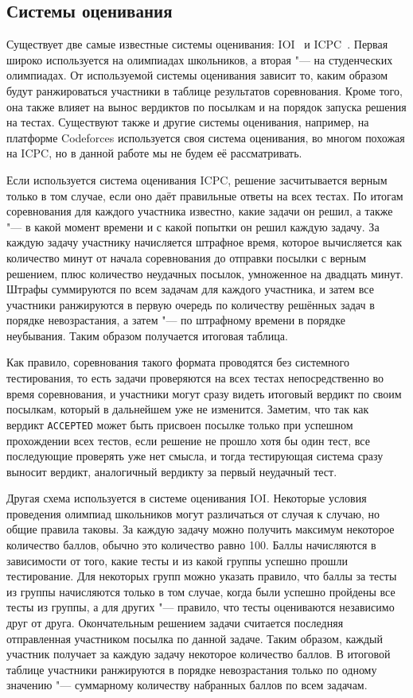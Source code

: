 \subsection{Системы оценивания}

Существует две самые известные системы оценивания: IOI~\cite{ioi} и ICPC~\cite{icpc}. Первая широко используется на олимпиадах школьников, а вторая "--- на студенческих олимпиадах. От используемой системы оценивания зависит то, каким образом будут ранжироваться участники в таблице результатов соревнования. Кроме того, она также влияет на вынос вердиктов по посылкам и на порядок запуска решения на тестах. Существуют также и другие системы оценивания, например, на платформе Codeforces \cite{codeforces} используется своя система оценивания, во многом похожая на ICPC, но в данной работе мы не будем её рассматривать.

Если используется система оценивания ICPC, решение засчитывается верным только в том случае, если оно даёт правильные ответы на всех тестах. По итогам соревнования для каждого участника известно, какие задачи он решил, а также "--- в какой момент времени и с какой попытки он решил каждую задачу. За каждую задачу участнику начисляется штрафное время, которое вычисляется как количество минут от начала соревнования до отправки посылки с верным решением, плюс количество неудачных посылок, умноженное на двадцать минут. Штрафы суммируются по всем задачам для каждого участника, и затем все участники ранжируются в первую очередь по количеству решённых задач в порядке невозрастания, а затем "--- по штрафному времени в порядке неубывания. Таким образом получается итоговая таблица.

Как правило, соревнования такого формата проводятся без системного тестирования, то есть задачи проверяются на всех тестах непосредственно во время соревнования, и участники могут сразу видеть итоговый вердикт по своим посылкам, который в дальнейшем уже не изменится. Заметим, что так как вердикт \texttt{ACCEPTED} может быть присвоен посылке только при успешном прохождении всех тестов, если решение не прошло хотя бы один тест, все последующие проверять уже нет смысла, и тогда тестирующая система сразу выносит вердикт, аналогичный вердикту за первый неудачный тест.

Другая схема используется в системе оценивания IOI. Некоторые условия проведения олимпиад школьников могут различаться от случая к случаю, но общие правила таковы. За каждую задачу можно получить максимум некоторое количество баллов, обычно это количество равно 100. Баллы начисляются в зависимости от того, какие тесты и из какой группы успешно прошли тестирование. Для некоторых групп можно указать правило, что баллы за тесты из группы начисляются только в том случае, когда были успешно пройдены все тесты из группы, а для других "--- правило, что тесты оцениваются независимо друг от друга. Окончательным решением задачи считается последняя отправленная участником посылка по данной задаче. Таким образом, каждый участник получает за каждую задачу некоторое количество баллов. В итоговой таблице участники ранжируются в порядке невозрастания только по одному значению "--- суммарному количеству набранных баллов по всем задачам.

